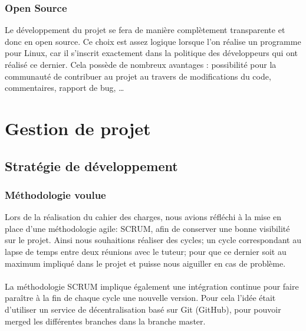 \documentclass[french]{report}
\begin{document}
\subsection{Open Source}
Le développement du projet se fera de manière complètement transparente et donc
en open source. Ce choix est assez logique lorsque l’on réalise un programme
pour Linux, car il s’inscrit exactement dans la politique des développeurs qui
ont réalisé ce dernier. Cela possède de nombreux avantages : possibilité pour
la communauté de contribuer au projet au travers de modifications du code,
commentaires, rapport de bug, \ldots

\chapter{Gestion de projet}

\newpage

\section{Stratégie de développement}

\subsection{Méthodologie voulue}
Lors de la réalisation du cahier des charges, nous avions réfléchi à la mise en
place d'une méthodologie agile: SCRUM, afin de conserver une bonne visibilité sur le
projet. Ainsi nous souhaitions réaliser des cycles; un cycle correspondant au
lapse de temps entre deux réunions avec le tuteur; pour que ce dernier soit au
maximum impliqué dans le projet et puisse nous aiguiller en cas de problème.
\\
\\
La méthodologie SCRUM implique également une intégration continue pour faire
paraître à la fin de chaque cycle une nouvelle version. Pour cela l'idée était
d'utiliser un service de décentralisation basé sur Git (GitHub), pour pouvoir merged les
différentes branches dans la branche master.
\end{document}
